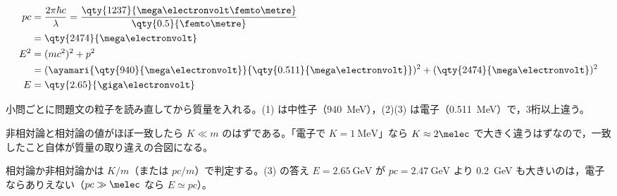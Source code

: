 \begin{align*}
  pc&=\frac{2\pi\hbar c}{\lambda}=\frac{\qty{1237}{\mega\electronvolt\femto\metre}}{\qty{0.5}{\femto\metre}}\\
  &=\qty{2474}{\mega\electronvolt}\\
  E^{2}&=(mc^{2})^{2}+p^{2}\\
  &=(\ayamari{\qty{940}{\mega\electronvolt}}{\qty{0.511}{\mega\electronvolt}})^{2}+(\qty{2474}{\mega\electronvolt})^{2}\\
  E&=\qty{2.65}{\giga\electronvolt}
\end{align*}
\item 小問ごとに問題文の粒子を読み直してから質量を入れる。(1) は中性子（\qty{940}{\mega\electronvolt}），(2)(3) は電子（\qty{0.511}{\mega\electronvolt}）で，3桁以上違う。
\item 非相対論と相対論の値がほぼ一致したら $K\ll m$ のはずである。「電子で $K=\qty{1}{\mega\electronvolt}$」なら $K\approx2\melec$ で大きく違うはずなので，一致したこと自体が質量の取り違えの合図になる。
\item 相対論か非相対論かは $K/m$（または $pc/m$）で判定する。(3) の答え $E=\qty{2.65}{\giga\electronvolt}$ が $pc=\qty{2.47}{\giga\electronvolt}$ より \qty{0.2}{\giga\electronvolt} も大きいのは，電子ならありえない（$pc\gg\melec$ なら $E\simeq pc$）。

